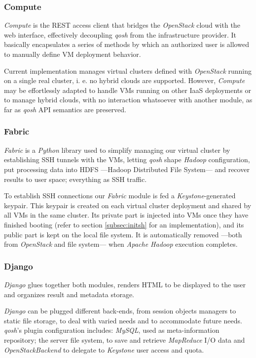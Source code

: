 \documentclass{sig-alternate}
\begin{document}
\subsubsection{Compute}
\noindent \emph{Compute} is the REST access client that bridges the \emph{OpenStack} cloud with the web interface, effectively decoupling \emph{qosh} from the infrastructure provider. It basically encapsulates a series of methods by which an authorized user is allowed to manually define VM deployment behavior.

Current implementation manages virtual clusters defined with \emph{OpenStack} running on a single real cluster, i. e. no hybrid clouds are supported. However, \emph{Compute} may be effortlessly adapted to handle VMs running on other IaaS deployments or to manage hybrid clouds, with no interaction whatsoever with another module, as far as \emph{qosh} API semantics are preserved.


\subsubsection{Fabric}
\noindent \emph{Fabric} is a \emph{Python} library used to simplify managing our virtual cluster by establishing SSH tunnels with the VMs, letting \emph{qosh} shape \emph{Hadoop} configuration, put processing data into HDFS ---Hadoop Distributed File System--- and recover results to user space; everything as SSH traffic.

To establish SSH connections our \emph{Fabric} module is fed a \emph{Keystone}-generated keypair. This keypair is created on each virtual cluster deployment and shared by all VMs in the same cluster. Its private part is injected into VMs once they have finished booting (refer to section \ref{subsec:initsh} for an implementation), and its public part is kept on the local file system. It is automatically removed ---both from \emph{OpenStack} and file system--- when \emph{Apache Hadoop} execution completes.


\subsubsection{Django}
\noindent \emph{Django} glues together both modules, renders HTML to be displayed to the user and organizes result and metadata storage.

\emph{Django} can be plugged different back-ends, from session objects managers to static file storage, to deal with varied needs and to accommodate future needs. \emph{qosh}'s plugin configuration includes: \emph{MySQL}, used as meta-information repository; the server file system, to save and retrieve \emph{MapReduce} I/O data and \emph{OpenStackBackend} to delegate to \emph{Keystone} user access and quota.
\end{document}

